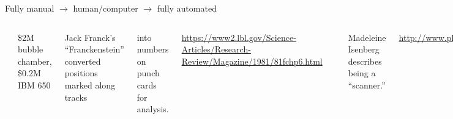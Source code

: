 \documentclass[aspectratio=169]{beamer}
\begin{document}
\begin{frame}{Fully manual $\to$ human/computer $\to$ fully automated}
\vspace{0.35 cm}
\begin{columns}[b]
\begin{columns}[b]
\includegraphics[height=2.9 cm]{franckenstein-2.jpg}

\$2M bubble chamber, \$0.2M IBM 650

\vspace{0.2 cm}
Jack Franck's ``Franckenstein'' converted positions marked along tracks
\end{columns}

into numbers on punch cards for analysis.

\vspace{0.2 cm}
\scriptsize
\textcolor{blue}{\url{https://www2.lbl.gov/Science-Articles/Research-Review/Magazine/1981/81fchp6.html}}

\vspace{0.2 cm}
\includegraphics[height=2.9 cm]{franckenstein-1.jpg}\hfill\includegraphics[height=2.9 cm]{franckenstein-4.jpg}

Madeleine Isenberg describes being a ``scanner.''

\scriptsize
\vspace{0.1 cm}
\textcolor{blue}{\url{http://www.physics.ucla.edu/marty/HighEnergyPhysics.pdf}}


\end{columns}
\end{frame}
\end{document}
